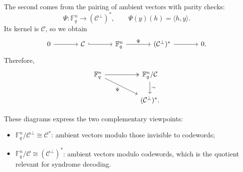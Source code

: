 \documentclass[11pt]{article}
\theoremstyle{remark}
\newcommand{\F}{\mathbb{F}}
\newcommand{\C}{\mathcal{C}}
\begin{document}
	The second comes from the pairing of ambient vectors with parity checks:
	\[
	\Psi:\F_q^n\to (\C^\perp)^*,\qquad \Psi(y)(h)=\langle h,y\rangle.
	\]
	Its kernel is \(\C\), so we obtain
	\[
	\begin{tikzcd}[column sep=large]
		0 \arrow[r] & \C \arrow[r, hook] & \F_q^n \arrow[r, "\Psi"] & (\C^\perp)^* \arrow[r] & 0.
	\end{tikzcd}
	\]
	Therefore,
	\[
	\begin{tikzcd}[column sep=huge]
		\F_q^n \arrow[r, two heads] \arrow[dr, "\Psi"'] & \F_q^n/\C \arrow[d, "\sim"] \\
		& (\C^\perp)^*.
	\end{tikzcd}
	\]
	
	These diagrams express the two complementary viewpoints:
	
	\begin{itemize}
		\item \(\F_q^n/\C^\perp \cong \C^*\): ambient vectors modulo those invisible to codewords;
		\item \(\F_q^n/\C \cong (\C^\perp)^*\): ambient vectors modulo codewords, which is the quotient relevant for syndrome decoding.
	\end{itemize}
\end{document}
